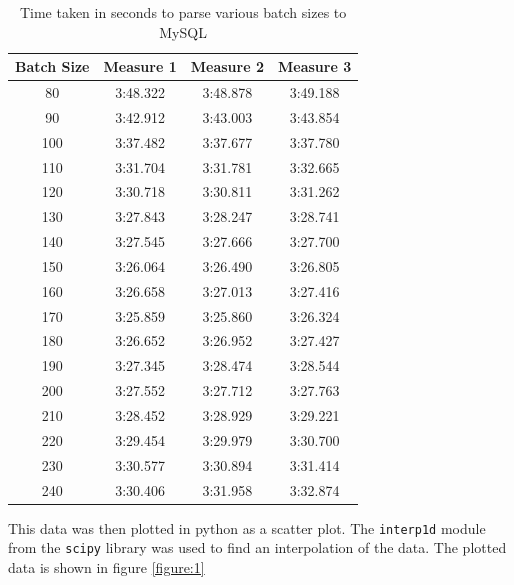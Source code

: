 \documentclass{article}
\begin{document}
\begin{table}[h!]
	\centering
	\begin{tabular}{||c c c c||}
		\hline
		Batch Size & Measure 1 & Measure 2 & Measure 3 \\ [0.5ex]
		\hline\hline
		80 & 3:48.322 & 3:48.878 & 3:49.188 \\ [0.5ex]
		\hline
		90 & 3:42.912 & 3:43.003 & 3:43.854 \\ [0.5ex]
		\hline
		100 & 3:37.482 & 3:37.677 & 3:37.780 \\ [0.5ex]
		\hline
		110 & 3:31.704 & 3:31.781 & 3:32.665 \\ [0.5ex]
		\hline
		120 & 3:30.718 & 3:30.811 & 3:31.262 \\ [0.5ex]
		\hline
		130 & 3:27.843 & 3:28.247 & 3:28.741 \\ [0.5ex]
		\hline
		140 & 3:27.545 & 3:27.666 & 3:27.700 \\ [0.5ex]
		\hline
		150 & 3:26.064 & 3:26.490 & 3:26.805 \\ [0.5ex]
		\hline
		160 & 3:26.658 & 3:27.013 & 3:27.416 \\ [0.5ex]
		\hline
		170 & 3:25.859 & 3:25.860 & 3:26.324 \\ [0.5ex]
		\hline
		180 & 3:26.652 & 3:26.952 & 3:27.427 \\ [0.5ex]
		\hline
		190 & 3:27.345 & 3:28.474 & 3:28.544 \\ [0.5ex]
		\hline
		200 & 3:27.552 & 3:27.712 & 3:27.763 \\ [0.5ex]
		\hline
		210 & 3:28.452 & 3:28.929 & 3:29.221 \\ [0.5ex]
		\hline
		220 & 3:29.454 & 3:29.979 & 3:30.700 \\ [0.5ex]
		\hline
		230 & 3:30.577 & 3:30.894 & 3:31.414 \\ [0.5ex]
		\hline
		240 & 3:30.406 & 3:31.958 & 3:32.874 \\ [0.5ex]
		\hline
	\end{tabular}
	\caption{Time taken in seconds to parse various batch sizes to MySQL}
	\label{table:1}
\end{table}

This data was then plotted in python as a scatter plot.  The \texttt{interp1d}
module from the \texttt{scipy} library was used to find an interpolation of
the data.  The plotted data is shown in figure \ref{figure:1}
\end{document}

